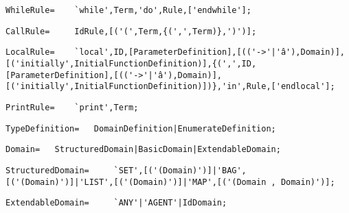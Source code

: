 \documentclass{article}
\begin{document}
    \begin{flushleft}
    \begin{lstlisting}[mathescape=true, breaklines=true]
      WhileRule= 	`while',Term,'do',Rule,['endwhile'];
    \end{lstlisting}
    \end{flushleft}
    \begin{flushleft}
    \begin{lstlisting}[mathescape=true, breaklines=true]
      CallRule= 	IdRule,[('(',Term,{(',',Term)},')')];
    \end{lstlisting}
    \end{flushleft}
    \begin{flushleft}
    \begin{lstlisting}[mathescape=true, breaklines=true]
      LocalRule= 	`local',ID,[ParameterDefinition],[(('->'|'â'),Domain)],[('initially',InitialFunctionDefinition)],{(',',ID,[ParameterDefinition],[(('->'|'â'),Domain)],[('initially',InitialFunctionDefinition)])},'in',Rule,['endlocal'];
    \end{lstlisting}
    \end{flushleft}
    \begin{flushleft}
    \begin{lstlisting}[mathescape=true, breaklines=true]
      PrintRule= 	`print',Term;
    \end{lstlisting}
    \end{flushleft}
    \begin{flushleft}
    \begin{lstlisting}[mathescape=true, breaklines=true]
      TypeDefinition= 	DomainDefinition|EnumerateDefinition;
    \end{lstlisting}
    \end{flushleft}
    \begin{flushleft}
    \begin{lstlisting}[mathescape=true, breaklines=true]
      Domain= 	StructuredDomain|BasicDomain|ExtendableDomain;
    \end{lstlisting}
    \end{flushleft}
    \begin{flushleft}
    \begin{lstlisting}[mathescape=true, breaklines=true]
      StructuredDomain= 	`SET',[('(Domain)')]|'BAG',[('(Domain)')]|'LIST',[('(Domain)')]|'MAP',[('(Domain , Domain)')];
    \end{lstlisting}
    \end{flushleft}
    \begin{flushleft}
    \begin{lstlisting}[mathescape=true, breaklines=true]
      ExtendableDomain= 	`ANY'|'AGENT'|IdDomain;
    \end{lstlisting}
    \end{flushleft}
\end{document}
